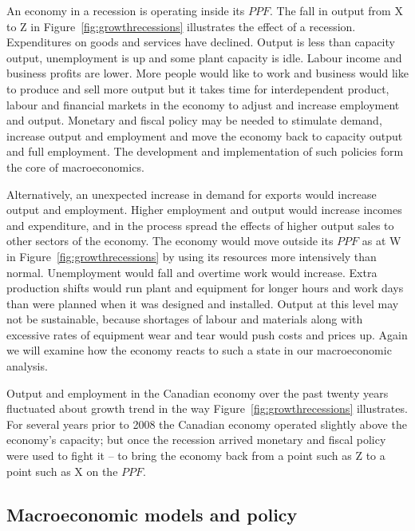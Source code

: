 An economy in a recession is operating inside its $PPF$. The fall in output from X to Z in Figure~\ref{fig:growthrecessions} illustrates the effect of a recession. Expenditures on goods and services have declined. Output is less than capacity output, unemployment is up and some plant capacity is idle. Labour income and business profits are lower.  More people would like to work and business would like to produce and sell more output but it takes time for interdependent product, labour and financial markets in the economy to adjust and increase employment and output. Monetary and fiscal policy may be needed to stimulate demand, increase output and employment and move the economy back to capacity output and full employment. The development and implementation of such policies form the core of macroeconomics. 

Alternatively, an unexpected increase in demand for exports would increase output and employment. Higher employment and output would increase incomes and expenditure, and in the process spread the effects of higher output sales to other sectors of the economy. The economy would move outside its $PPF$ as at W in Figure~\ref{fig:growthrecessions} by using its resources more intensively than normal. Unemployment would fall and overtime work would increase. Extra production shifts would run plant and equipment for longer hours and work days than were planned when it was designed and installed. Output at this level may not be sustainable, because shortages of labour and materials along with excessive rates of equipment wear and tear would push costs and prices up. Again we will examine how the economy reacts to such a state in our macroeconomic analysis. 



Output and employment in the Canadian economy over the past twenty years fluctuated about growth trend in the way Figure~\ref{fig:growthrecessions} illustrates. For several years prior to 2008 the Canadian economy operated slightly above the economy's capacity; but once the recession arrived monetary and fiscal policy were used to fight it -- to bring the economy back from a point such as Z to a point such as X on the $PPF$. 

\subsection*{Macroeconomic models and policy}

